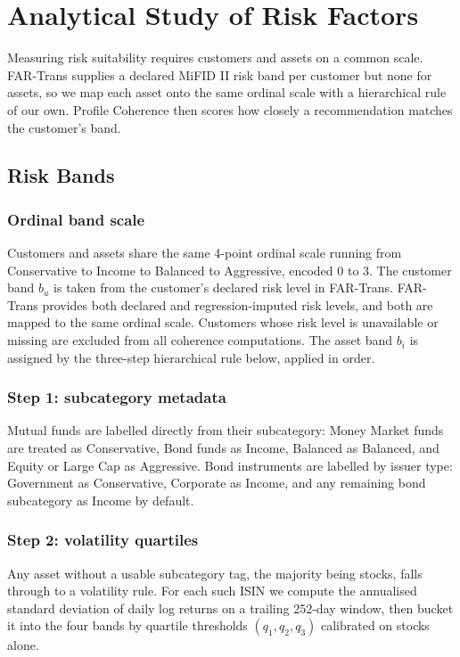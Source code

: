 \section{Analytical Study of Risk Factors}
\label{sec:analysis}

Measuring risk suitability requires customers and assets on a common scale. FAR-Trans supplies a declared MiFID II risk band per customer but none for assets, so we map each asset onto the same ordinal scale with a hierarchical rule of our own. Profile Coherence then scores how closely a recommendation matches the customer's band.

\subsection{Risk Bands}
\label{sec:analysis:bands}

\subsubsection{Ordinal band scale}
Customers and assets share the same 4-point ordinal scale running from Conservative to Income to Balanced to Aggressive, encoded 0 to 3. The customer band $b_u$ is taken from the customer's declared risk level in FAR-Trans. FAR-Trans provides both declared and regression-imputed risk levels, and both are mapped to the same ordinal scale. Customers whose risk level is unavailable or missing are excluded from all coherence computations. The asset band $b_i$ is assigned by the three-step hierarchical rule below, applied in order.

\subsubsection{Step 1: subcategory metadata} Mutual funds are labelled directly from their subcategory: Money Market funds are treated as Conservative, Bond funds as Income, Balanced as Balanced, and Equity or Large Cap as Aggressive. Bond instruments are labelled by issuer type: Government as Conservative, Corporate as Income, and any remaining bond subcategory as Income by default.

\subsubsection{Step 2: volatility quartiles} Any asset without a usable subcategory tag, the majority being stocks, falls through to a volatility rule. For each such ISIN we compute the annualised standard deviation of daily log returns on a trailing 252-day window, then bucket it into the four bands by quartile thresholds $(q_1, q_2, q_3)$ calibrated on stocks alone.

